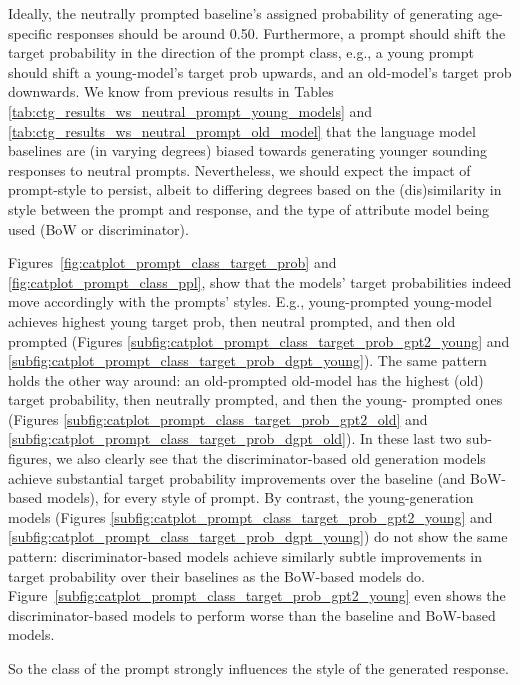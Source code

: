 Ideally, the neutrally prompted baseline's assigned probability of generating age-specific responses should be around 0.50. Furthermore, a prompt should shift the target probability in the direction of the prompt class, e.g., a young prompt should shift a young-model's target prob upwards, and an old-model's target prob downwards. We know from previous results in Tables \ref{tab:ctg_results_ws_neutral_prompt_young_models} and \ref{tab:ctg_results_ws_neutral_prompt_old_model} that the language model baselines are (in varying degrees) biased towards generating younger sounding responses to neutral prompts. Nevertheless, we should expect the impact of prompt-style to persist, albeit to differing degrees based on the (dis)similarity in style between the prompt and response, and the type of attribute model being used (BoW or discriminator).


Figures~\ref{fig:catplot_prompt_class_target_prob} and \ref{fig:catplot_prompt_class_ppl}, show that the models' target probabilities indeed move accordingly with the prompts' styles. E.g., young-prompted young-model achieves highest young target prob, then neutral prompted, and then old prompted (Figures \ref{subfig:catplot_prompt_class_target_prob_gpt2_young} and \ref{subfig:catplot_prompt_class_target_prob_dgpt_young}). The same pattern holds the other way around: an old-prompted old-model has the highest (old) target probability, then neutrally prompted, and then the young- prompted ones (Figures \ref{subfig:catplot_prompt_class_target_prob_gpt2_old} and \ref{subfig:catplot_prompt_class_target_prob_dgpt_old}). In these last two sub-figures, we also clearly see that the discriminator-based old generation models achieve substantial target probability improvements over the baseline (and BoW-based models), for every style of prompt. By contrast, the young-generation models (Figures \ref{subfig:catplot_prompt_class_target_prob_gpt2_young} and \ref{subfig:catplot_prompt_class_target_prob_dgpt_young}) do not show the same pattern: discriminator-based models achieve similarly subtle improvements in target probability over their baselines as the BoW-based models do. Figure~\ref{subfig:catplot_prompt_class_target_prob_gpt2_young} even shows the discriminator-based models to perform worse than the baseline and BoW-based models.

So the class of the prompt strongly influences the style of the generated response.

